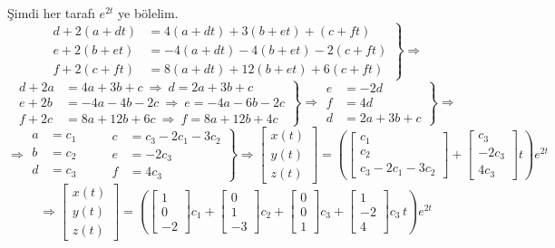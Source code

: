 \documentclass[11pt,a4paper]{article}
\begin{document}
\begin{cozum}
Şimdi her tarafı $e^{2t}$ ye bölelim.
\[
\left.\begin{aligned}
d + 2(a+dt) &= 4(a+dt) + 3(b+et) + (c+ft) \\
e + 2(b+et) &= -4(a+dt) - 4(b+et) - 2(c+ft) \\
f + 2(c+ft) &= 8(a+dt) + 12(b+et) + 6(c+ft)
\end{aligned}\right\} \Rightarrow
\]
\[
\left.\begin{aligned}
d + 2a &= 4a + 3b + c \ \Rightarrow \ d = 2a + 3b + c \\
e + 2b &= -4a - 4b - 2c \ \Rightarrow \ e = -4a - 6b - 2c \\
f + 2c &= 8a + 12b + 6c \ \Rightarrow \ f = 8a + 12b + 4c
\end{aligned}\right\} \Rightarrow \left.\begin{aligned} e &= -2d \\ f &= 4d \\ d &= 2a + 3b + c \end{aligned}\right\} \Rightarrow
\]
\[
\Rightarrow \left.\begin{aligned} a &= c_1 \\ b &= c_2 \\ d &= c_3 \end{aligned} \qquad \begin{aligned} c &= c_3 - 2c_1 - 3c_2 \\ e &= -2c_3 \\ f &= 4c_3 \end{aligned}\right\} \Rightarrow \begin{bmatrix} x(t) \\ y(t) \\ z(t) \end{bmatrix} = \left(\begin{bmatrix} c_1 \\ c_2 \\ c_3 - 2c_1 - 3c_2 \end{bmatrix} + \begin{bmatrix} c_3 \\ -2c_3 \\ 4c_3 \end{bmatrix}t\right)e^{2t}
\]
\[
\Rightarrow \begin{bmatrix} x(t) \\ y(t) \\ z(t) \end{bmatrix} = \left(\begin{bmatrix} 1 \\ 0 \\ -2 \end{bmatrix}c_1 + \begin{bmatrix} 0 \\ 1 \\ -3 \end{bmatrix}c_2 + \begin{bmatrix} 0 \\ 0 \\ 1 \end{bmatrix}c_3 + \begin{bmatrix} 1 \\ -2 \\ 4 \end{bmatrix}c_3\,t\right)e^{2t}
\]
\end{cozum}
\end{document}

